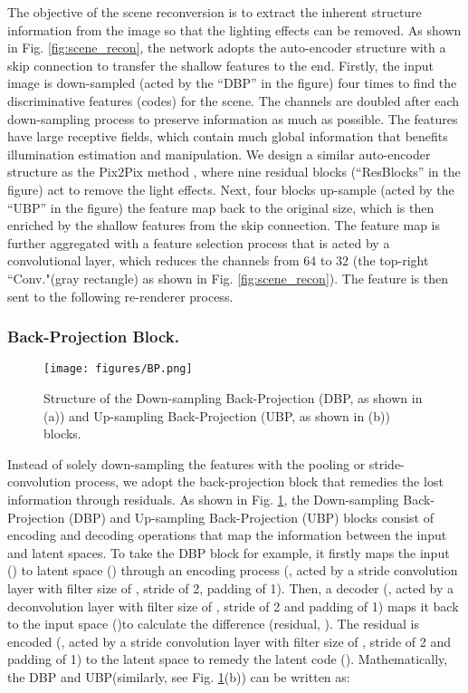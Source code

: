 \documentclass[runningheads]{llncs}
\begin{document}
The objective of the scene reconversion is to extract the inherent structure information from the image so that the lighting effects can be removed. As shown in Fig. \ref{fig:scene_recon}, the network adopts the auto-encoder \cite{UNet} structure with a skip connection to transfer the shallow features to the end. Firstly, the input image is down-sampled (acted by the ``DBP'' in the figure) four times to find the discriminative features (codes) for the scene. The channels are doubled after each down-sampling process to preserve information as much as possible. The features have large receptive fields, which contain much global information that benefits illumination estimation and manipulation. We design a similar auto-encoder structure as the Pix2Pix method \cite{pix2pix}, where nine residual blocks \cite{Resnet2016} (``ResBlocks'' in the figure) act to remove the light effects. Next, four blocks up-sample (acted by the ``UBP'' in the figure) the feature map back to the original size, which is then enriched by the shallow features from the skip connection. The feature map is further aggregated with a feature selection process that is acted by a convolutional layer, which reduces the channels from 64 to 32 (the top-right ``Conv."(gray rectangle) as shown in Fig. \ref{fig:scene_recon}). The feature is then sent to the following re-renderer process.

\vskip -0.5cm
\baselineskip 
\subsubsection{Back-Projection Block.}

\begin{figure}[t]
    \centering
    \texttt{[image: figures/BP.png]}
   \baselineskip 
    \caption{Structure of the Down-sampling Back-Projection (DBP, as shown in (a)) and Up-sampling Back-Projection (UBP, as shown in (b)) blocks.}
    \label{fig:BP}
   \baselineskip 
\end{figure}


Instead of solely down-sampling the features with the pooling or stride-convolution process, we adopt the back-projection block that remedies the lost information through residuals. As shown in Fig. \ref{fig:BP},  the Down-sampling Back-Projection (DBP) and Up-sampling Back-Projection (UBP) blocks consist of encoding and decoding operations that map the information between the input and latent spaces. To take the DBP block for example, it firstly maps the input () to latent space () through an encoding process (, acted by a stride convolution layer with filter size of , stride of 2, padding of 1). Then, a decoder (, acted by a deconvolution layer with filter size of , stride of 2 and padding of 1) maps it back to the input space ()to calculate the difference (residual, ). The residual is encoded (, acted by a stride convolution layer with filter size of , stride of 2 and padding of 1) to the latent space  to remedy the latent code  (). Mathematically, the DBP and UBP(similarly, see Fig. \ref{fig:BP}(b)) can be written as:
\baselineskip 
\end{document}
